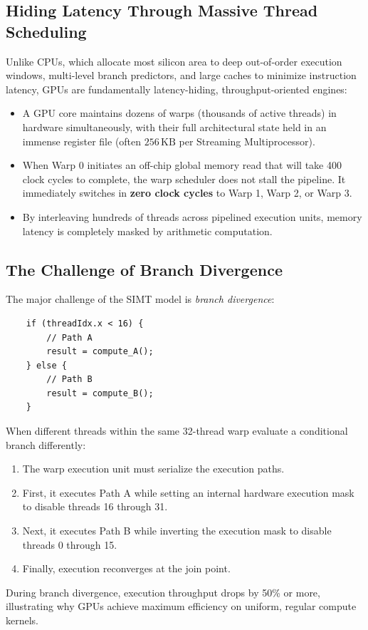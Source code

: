 \subsection{Hiding Latency Through Massive Thread Scheduling}
Unlike CPUs, which allocate most silicon area to deep out-of-order execution windows, multi-level branch predictors, and large caches to minimize instruction latency, GPUs are fundamentally latency-hiding, throughput-oriented engines:
\begin{itemize}
    \item A GPU core maintains dozens of warps (thousands of active threads) in hardware simultaneously, with their full architectural state held in an immense register file (often $256\,\text{KB}$ per Streaming Multiprocessor).
    \item When Warp 0 initiates an off-chip global memory read that will take 400 clock cycles to complete, the warp scheduler does not stall the pipeline. It immediately switches in \textbf{zero clock cycles} to Warp 1, Warp 2, or Warp 3.
    \item By interleaving hundreds of threads across pipelined execution units, memory latency is completely masked by arithmetic computation.
\end{itemize}

\subsection{The Challenge of Branch Divergence}
The major challenge of the SIMT model is \textit{branch divergence}:
\begin{verbatim}
    if (threadIdx.x < 16) {
        // Path A
        result = compute_A();
    } else {
        // Path B
        result = compute_B();
    }
\end{verbatim}
When different threads within the same 32-thread warp evaluate a conditional branch differently:
\begin{enumerate}
    \item The warp execution unit must serialize the execution paths.
    \item First, it executes Path A while setting an internal hardware execution mask to disable threads 16 through 31.
    \item Next, it executes Path B while inverting the execution mask to disable threads 0 through 15.
    \item Finally, execution reconverges at the join point.
\end{enumerate}
During branch divergence, execution throughput drops by 50\% or more, illustrating why GPUs achieve maximum efficiency on uniform, regular compute kernels.

